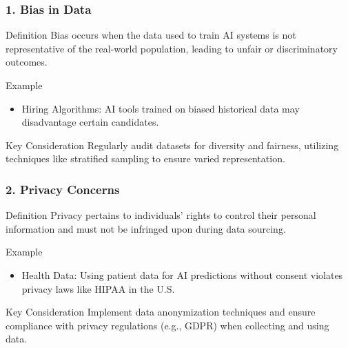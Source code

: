 \documentclass[aspectratio=169]{beamer}
\begin{document}
\begin{frame}[fragile]
    \frametitle{1. Bias in Data}
    \begin{block}{Definition}
        Bias occurs when the data used to train AI systems is not representative of the real-world population, leading to unfair or discriminatory outcomes.
    \end{block}
    
    \begin{block}{Example}
        \begin{itemize}
            \item Hiring Algorithms: AI tools trained on biased historical data may disadvantage certain candidates.
        \end{itemize}
    \end{block}
    
    \begin{block}{Key Consideration}
        Regularly audit datasets for diversity and fairness, utilizing techniques like stratified sampling to ensure varied representation.
    \end{block}
\end{frame}

\begin{frame}[fragile]
    \frametitle{2. Privacy Concerns}
    \begin{block}{Definition}
        Privacy pertains to individuals' rights to control their personal information and must not be infringed upon during data sourcing.
    \end{block}
    
    \begin{block}{Example}
        \begin{itemize}
            \item Health Data: Using patient data for AI predictions without consent violates privacy laws like HIPAA in the U.S.
        \end{itemize}
    \end{block}
    
    \begin{block}{Key Consideration}
        Implement data anonymization techniques and ensure compliance with privacy regulations (e.g., GDPR) when collecting and using data.
    \end{block}
\end{frame}
\end{document}
